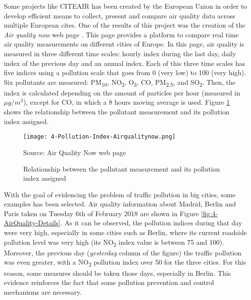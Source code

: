 Some projects like \ac{CITEAIR} has been created by the European Union \cite{citeair} in order to develop efficient means to collect, present and compare air quality data across multiple European cites. One of the results of this project was the creation of the \emph{Air quality now} web page \cite{airqualitynow}. This page provides a platform to compare real time air quality measurements on different cities of Europe. In this page, air quality is measured in three different time scales: hourly index during the last day, daily index of the previous day and an annual index. Each of this three time scales has five indices using a pollution scale that goes from 0 (very low) to 100 (very high). Six pollutants are measured: PM\textsubscript{10}, NO\textsubscript{2}, O\textsubscript{3}, CO, PM\textsubscript{2.5}, and SO\textsubscript{2}. Then, the index is calculated depending on the amount of particles per hour (measured in $\mu g/m^3$), except for CO, in which a 8 hours moving average is used. Figure \ref{fig:4-Pollution-Index-Airqualitynow} shows the relationship between the pollutant measurement and its pollution index assigned.

\begin{figure}[!h]
	\begin{center}
		\texttt{[image: 4-Pollution-Index-Airqualitynow.png]}	
		\caption{Relationship between the pollutant measurement and its pollution index assigned}{Source: Air Quality Now web page \cite{airqualitynow}}
		\label{fig:4-Pollution-Index-Airqualitynow}
	\end{center}
\end{figure}

With the goal of evidencing the problem of traffic pollution in big cities, some examples has been selected. Air quality information about Madrid, Berlin and Paris taken on Tuesday 6th of February 2018 are shown in Figure \ref{fig:4-AirQuality-Details}.
As it can be observed, the pollution indices during that day were very high, especially in some cities such as Berlin, where its current roadside pollution level was very high (its NO\textsubscript{2} index value is between 75 and 100). Moreover, the previous day (\textit{yesterday} column of the figure) the traffic pollution was even greater, with a NO\textsubscript{2} pollution index over 50 for the three cities. For this reason, some measures should be taken those days, especially in Berlin. This evidence reinforces the fact that some pollution prevention and control mechanisms are necessary.

